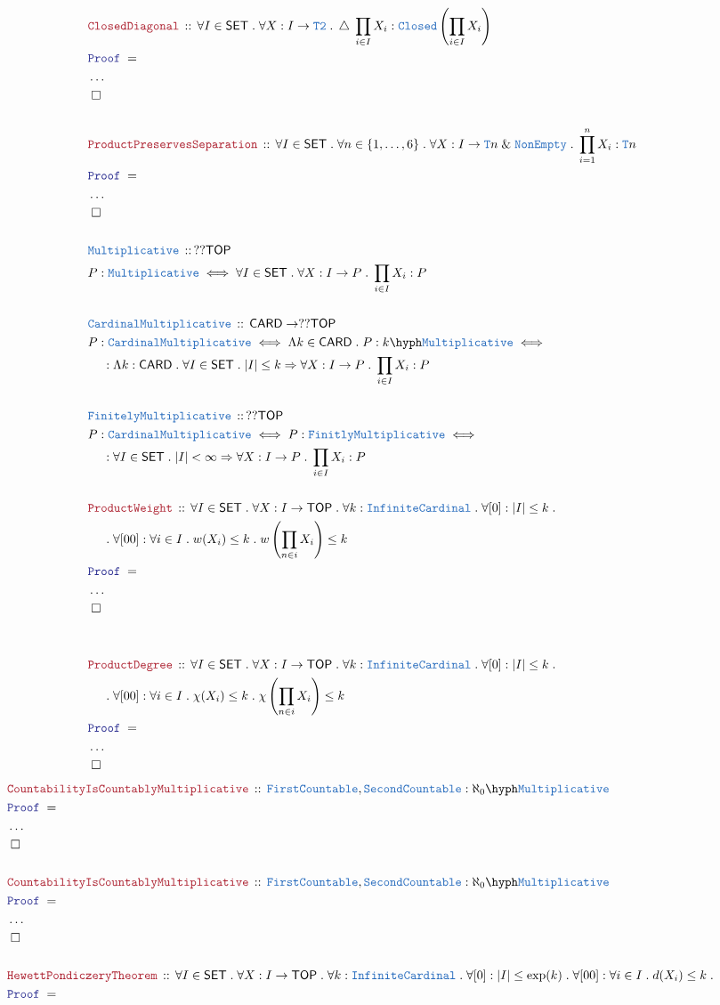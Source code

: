 \documentclass[12pt]{scrartcl}
\newcommand{\TYPE}[1]{\textcolor{NavyBlue}{\mathtt{#1}}}
\newcommand{\LOGIC}[1]{\textcolor{Blue}{\mathtt{#1}}}
\newcommand{\THM}[1]{\textcolor{Maroon}{\mathtt{#1}}}
\renewcommand{\.}{\; . \;}
\newcommand{\Theorem}[2]{& \THM{#1} \, :: \, #2 \\ & \Proof = \\ }
\newcommand{\DeclareType}[2]{& \TYPE{#1} \, :: \, #2 \\}
\newcommand{\DefineType}[3]{& #1 : \TYPE{#2} \iff #3 \\}
\newcommand{\DefineNamedType}[4]{& #1 : \TYPE{#2} \iff #3 \iff #4 \\}
\newcommand{\NewLine}{\\ & \kern 1pc}
\newcommand{\Page}[1]{ \begin{align*} #1 \end{align*}   }
\newcommand{\NoProof}{ & \ldots \\ \EndProof}
\renewcommand{\And}{\; \& \;}
\newcommand{\Imply}{\Rightarrow}
\newcommand{\QED}{\; \square}
\newcommand{\EndProof}{& \QED \\}
\newcommand{\Proof}{\LOGIC{Proof} \; }
\newcommand{\SET}{\mathsf{SET}}
\DeclareMathOperator{\diag}{\triangle}
\newcommand{\TOP}{\mathsf{TOP}}
\begin{document}
\Page{
	\Theorem{ClosedDiagonal}
	{
		\forall I \in \SET \.
		\forall X : I \to \TYPE{T2} \.
		\diag \; \prod_{i \in I} X_i :\TYPE{Closed}\left( \prod_{i \in I} X_i \right)
	}
	\NoProof
	\\
	\Theorem{ProductPreservesSeparation}
	{
		\forall I \in \SET \.
		\forall n \in \{1,\ldots, 6\} \.
		\forall X : I \to \TYPE{T}n \And \TYPE{NonEmpty} \. 
		\prod^n_{i=1} X_i : \TYPE{T}n
	}
	\NoProof
	\\
	\DeclareType{Multiplicative}
	{
		??\TOP
	}
	\DefineType{P}{\TYPE{Multiplicative}}{\forall I \in \SET \. \forall X : I \to P \. \prod_{i \in I} X_i : P }  
	\\
	\DeclareType{CardinalMultiplicative}
	{
		\mathsf{CARD} \to ??\TOP
	}
	\DefineNamedType{P}{\TYPE{CardinalMultiplicative}}{\Lambda k \in \mathsf{CARD} \. P : k\hyph\TYPE{Multiplicative}}
	{
		\NewLine : 
		\Lambda k : \mathsf{CARD} \. 
		\forall I \in \SET \. 
		|I| \le k \Imply  \forall X : I \to P \. 
		\prod_{i \in I} X_i : P 
	}  
	\\
	\DeclareType{FinitelyMultiplicative}
	{
		 ??\TOP
	}
	\DefineNamedType{P}{\TYPE{CardinalMultiplicative}}{ P :\TYPE{FinitlyMultiplicative}}
	{
		\NewLine : 
		\forall I \in \SET \. 
		|I| < \infty \Imply  \forall X : I \to P \. 
		\prod_{i \in I} X_i : P 
	}
	\\
	\Theorem{ProductWeight}{ 
			\forall I \in \SET \.
			\forall X :  I \to \TOP \.
			\forall k : \TYPE{InfiniteCardinal} \.
			\forall [0] : |I| \le k \. \NewLine \. 
			\forall [00] :\forall i \in I \. w(X_i) \le k \.
			w\left( \prod_{n \in i} X_i \right) \le k
	}
	\NoProof
	\\
	\\
	\Theorem{ProductDegree}{ 
			\forall I \in \SET \.
			\forall X :  I \to \TOP \.
			\forall k : \TYPE{InfiniteCardinal} \.
			\forall [0] : |I| \le k \. \NewLine \. 
			\forall [00] :\forall i \in I \. \chi(X_i) \le k \.
			\chi\left( \prod_{n \in i} X_i \right) \le k
	}
	\NoProof
}\Page{
	\Theorem{CountabilityIsCountablyMultiplicative}
	{
		\TYPE{FirstCountable}, \TYPE{SecondCountable} : \aleph_0\hyph\TYPE{Multiplicative }  
	}
	\NoProof
	\\
	\Theorem{CountabilityIsCountablyMultiplicative}
	{
		\TYPE{FirstCountable}, \TYPE{SecondCountable} : \aleph_0\hyph\TYPE{Multiplicative }  
	}
	\NoProof
	\\
	\Theorem{HewettPondiczeryTheorem}
	{
		\forall I \in \SET \.
		\forall X : I \to \TOP \.
		\forall k : \TYPE{InfiniteCardinal} \.
		\forall [0] : |I| \le \exp(k) \.
		\forall [00] : \forall i \in I \. d(X_i) \le k \.
}}
\end{document}
